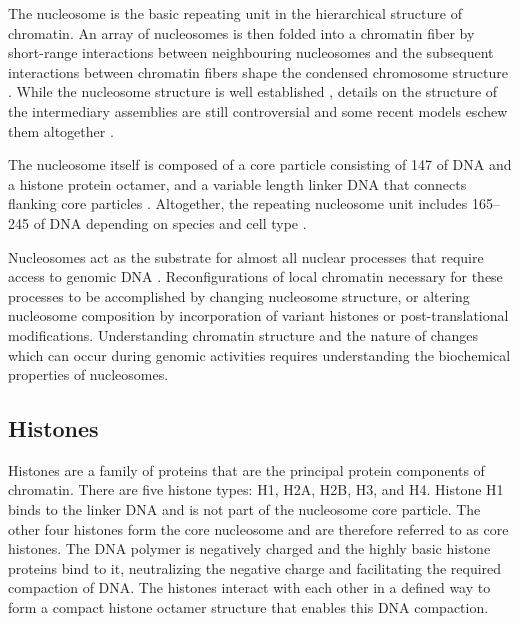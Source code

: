   The nucleosome is the
  basic repeating unit in the hierarchical structure of chromatin.
  An array of nucleosomes is then folded into a chromatin fiber by
  short-range interactions between neighbouring nucleosomes
  and the subsequent interactions between chromatin fibers shape the
  condensed chromosome structure .
  While the nucleosome
  structure is well established \citep{luger1997-28angstrom},
  details on the structure of the
  intermediary assemblies are still controversial and some recent models
  eschew them altogether
  \citep{fussner2011-no-30nm-fibre, luger2012-chromatin-review}.

  The nucleosome itself is composed of a core particle
  consisting of \SI{147}{\bp} of DNA and a histone protein octamer,
  and a variable length linker DNA that connects
  flanking core particles .
  Altogether, the repeating nucleosome unit
  includes \SIrange{165}{245}{\bp} of DNA depending on species and
  cell type \citep{widom1992-linker-length}.

  Nucleosomes act as the substrate for almost all nuclear processes that
  require access to genomic DNA \citep{controlling-double-helix}.
  Reconfigurations of local chromatin necessary for these processes to
  be accomplished by changing nucleosome structure, or altering nucleosome
  composition by incorporation of variant histones or post-translational
  modifications.
  Understanding chromatin structure and the nature of changes which can
  occur during genomic activities
  requires understanding the biochemical properties of nucleosomes.

  \subsection{Histones}

    Histones are a family of proteins that are the principal protein components
    of chromatin.
    There are five histone types: H1, H2A, H2B, H3, and H4.
    Histone H1 binds to the linker DNA and is not part of the
    nucleosome core particle.
    The other four histones form the core
    nucleosome and are therefore referred to as core histones.
    The DNA polymer is negatively charged and the highly
    basic histone proteins bind to it, neutralizing the negative charge
    and facilitating the required compaction of DNA.
    The histones interact with each other in a defined way to form
    a compact histone octamer structure that enables this
    DNA compaction.

